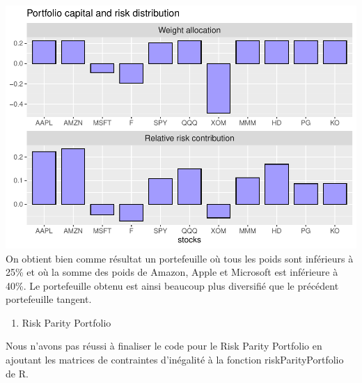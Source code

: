 \documentclass[
]{article}
\newenvironment{Shaded}{\begin{snugshade}}{\end{snugshade}}
\newcommand{\CommentTok}[1]{\textcolor[rgb]{0.56,0.35,0.01}{\textit{#1}}}
\newcommand{\DecValTok}[1]{\textcolor[rgb]{0.00,0.00,0.81}{#1}}
\newcommand{\FunctionTok}[1]{\textcolor[rgb]{0.00,0.00,0.00}{#1}}
\newcommand{\NormalTok}[1]{#1}
\newcommand{\OtherTok}[1]{\textcolor[rgb]{0.56,0.35,0.01}{#1}}
\newcommand{\SpecialCharTok}[1]{\textcolor[rgb]{0.00,0.00,0.00}{#1}}
\providecommand{\tightlist}{%
  \setlength{\itemsep}{0pt}\setlength{\parskip}{0pt}}
\begin{document}
\includegraphics{TP-7-v2_files/figure-latex/unnamed-chunk-9-1.pdf} On
obtient bien comme résultat un portefeuille où tous les poids sont
inférieurs à 25\% et où la somme des poids de Amazon, Apple et Microsoft
est inférieure à 40\%. Le portefeuille obtenu est ainsi beaucoup plus
diversifié que le précédent portefeuille tangent.

\begin{enumerate}
\def\labelenumi{\arabic{enumi})}
\setcounter{enumi}{1}
\tightlist
\item
  Risk Parity Portfolio
\end{enumerate}

\begin{Shaded}
\end{Shaded}

Nous n'avons pas réussi à finaliser le code pour le Risk Parity
Portfolio en ajoutant les matrices de contraintes d'inégalité à la
fonction riskParityPortfolio de R.
\end{document}
